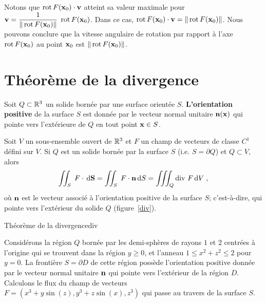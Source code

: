 {Notons que $\operatorname{rot} F(\mathbf{x}_0) \cdot \mathbf{v}$ atteint sa valeur
maximale pour
$\displaystyle \mathbf{v} = \frac{1}{\|\operatorname{rot} F(\mathbf{x}_0)\|}\; \operatorname{rot} F(\mathbf{x}_0)$.
Dans ce cas,
$\operatorname{rot} F(\mathbf{x}_0) \cdot \mathbf{v} = \|\operatorname{rot} F(\mathbf{x}_0)\|$.
Nous pouvons conclure que la vitesse angulaire de rotation par rapport à
l'axe $\operatorname{rot} F(\mathbf{x}_0)$ au point $\mathbf{x}_0$ est
$\|\operatorname{rot} F(\mathbf{x}_0)\|$.

\section{Théorème de la divergence}

Soit $Q \subset \mathbb{R}^3$ un solide bornée par une surface orientée $S$.
{\bfseries L'orientation positive} de la surface $S$ est donnée par le
vecteur normal unitaire $\mathbf{n}(\mathbf{x})$ qui pointe vers l'extérieure
de $Q$ en tout point $\mathbf{x} \in S$.

\begin{focus}{\thm}
Soit $V$ un sous-ensemble ouvert de $\mathbb{R}^3$ et $F$ un champ de
vecteurs de classe $C^1$ défini sur $V$.  Si $Q$ est un solide bornée
par la surface $S$ (i.e. $S = \partial Q$) et $Q \subset V$, alors
\[
\iint_S\;F\cdot \,\mathrm{d}\mathbf{S}
= \iint_S\;F\cdot \mathbf{n} \,\mathrm{d}S = \iiint_Q \operatorname{div}\,F \,\mathrm{d}V \; ,
\]
où $\mathbf{n}$ est le vecteur associé à l'orientation positive de la surface
$S$; c'est-à-dire, qui pointe vers l'extérieur du solide $Q$
(figure~\ref{div}).
\end{focus}

{Théorème de la divergence}{div}

\begin{egg}
Considérons la région $Q$ bornée par les demi-sphères de rayons
$1$ et $2$ centrées à l'origine qui se trouvent dans la région
$y \geq 0$, et l'anneau $1\leq x^2 + z^2 \leq 2$ pour $y=0$.
La frontière $S = \partial D$ de cette région possède l'orientation
positive donnée par le vecteur normal unitaire $\mathbf{n}$ qui pointe
vers l'extérieur de la région $D$.  Calculons le flux du champ
de vecteurs $F = (x^3 + y\sin(z) , y^3 + z \sin(x), z^3)$ qui
passe au travers de la surface $S$.


\end{egg}}

